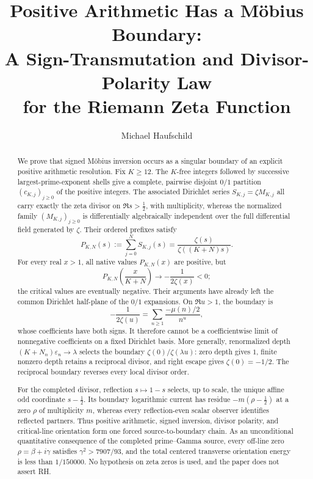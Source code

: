 \documentclass[11pt]{article}
\title{Positive Arithmetic Has a M\"obius Boundary:\\
A Sign-Transmutation and Divisor-Polarity Law\\
for the Riemann Zeta Function}
\author{Michael Haufschild}
\date{}
\theoremstyle{definition}
\theoremstyle{remark}
\begin{document}
\maketitle

\begin{abstract}
We prove that signed M\"obius inversion occurs as a singular boundary of an explicit positive
arithmetic resolution.  Fix \(K\geq12\).  The \(K\)-free integers followed by successive
largest-prime-exponent shells give a complete, pairwise disjoint \(0/1\) partition
\((c_{K,j})_{j\geq0}\) of the positive integers.  The associated Dirichlet series
\(S_{K,j}=\zeta M_{K,j}\) all carry exactly the zeta divisor on
\(\Re s>\tfrac12\), with multiplicity, whereas the normalized family
\((M_{K,j})_{j\geq0}\) is differentially algebraically independent over the full differential
field generated by \(\zeta\).  Their ordered prefixes satisfy
\[
 P_{K,N}(s):=\sum_{j=0}^{N}S_{K,j}(s)
 =\frac{\zeta(s)}{\zeta((K+N)s)}.
\]
For every real \(x>1\), all native values \(P_{K,N}(x)\) are positive, but
\[
 P_{K,N}\!\left(\frac{x}{K+N}\right)
 \longrightarrow-\frac1{2\zeta(x)}<0;
\]
the critical values are eventually negative.  Their arguments have already left the common
Dirichlet half-plane of the \(0/1\) expansions.  On \(\Re u>1\), the boundary is
\[
 -\frac1{2\zeta(u)}
 =\sum_{n\geq1}\frac{-\mu(n)/2}{n^u},
\]
whose coefficients have both signs.  It therefore cannot be a coefficientwise limit of
nonnegative coefficients on a fixed Dirichlet basis.  More generally, renormalized depth
\((K+N_n)\varepsilon_n\to\lambda\) selects the boundary
\(\zeta(0)/\zeta(\lambda u)\): zero depth gives \(1\), finite nonzero depth retains a reciprocal
divisor, and right escape gives \(\zeta(0)=-1/2\).  The reciprocal boundary reverses every local
divisor order.

For the completed divisor, reflection \(s\mapsto1-s\) selects, up to scale, the unique affine
odd coordinate \(s-\tfrac12\).  Its boundary logarithmic current has residue
\(-m(\rho-\tfrac12)\) at a zero \(\rho\) of multiplicity \(m\), whereas every reflection-even
scalar observer identifies reflected partners.  Thus positive arithmetic, signed inversion,
divisor polarity, and critical-line orientation form one forced source-to-boundary chain.
As an unconditional quantitative consequence of the completed prime--Gamma source, every
off-line zero \(\rho=\beta+i\gamma\) satisfies
\(\gamma^2>7907/93\), and the total centered transverse orientation energy is
less than \(1/150000\).  No hypothesis on zeta zeros is used, and the paper does not assert RH.
\end{abstract}
\end{document}
